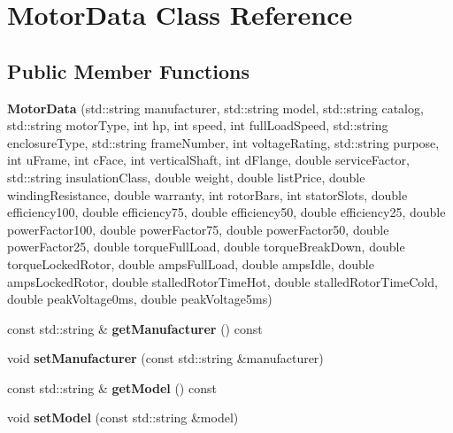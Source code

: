 \hypertarget{class_motor_data}{}\section{Motor\+Data Class Reference}
\label{class_motor_data}
\subsection*{Public Member Functions}
\begin{DoxyCompactItemize}
\item 
\mbox{\label{class_motor_data_aebca34509f0587da9fe3d488aba3a94e}} 
{\bfseries Motor\+Data} (std\+::string manufacturer, std\+::string model, std\+::string catalog, std\+::string motor\+Type, int hp, int speed, int full\+Load\+Speed, std\+::string enclosure\+Type, std\+::string frame\+Number, int voltage\+Rating, std\+::string purpose, int u\+Frame, int c\+Face, int vertical\+Shaft, int d\+Flange, double service\+Factor, std\+::string insulation\+Class, double weight, double list\+Price, double winding\+Resistance, double warranty, int rotor\+Bars, int stator\+Slots, double efficiency100, double efficiency75, double efficiency50, double efficiency25, double power\+Factor100, double power\+Factor75, double power\+Factor50, double power\+Factor25, double torque\+Full\+Load, double torque\+Break\+Down, double torque\+Locked\+Rotor, double amps\+Full\+Load, double amps\+Idle, double amps\+Locked\+Rotor, double stalled\+Rotor\+Time\+Hot, double stalled\+Rotor\+Time\+Cold, double peak\+Voltage0ms, double peak\+Voltage5ms)
\item 
\mbox{\label{class_motor_data_a7740ec636c42ee3d6b2a8ce94864043a}} 
const std\+::string \& {\bfseries get\+Manufacturer} () const
\item 
\mbox{\label{class_motor_data_a3bd37613532ae8c3ca1f40d474af75a2}} 
void {\bfseries set\+Manufacturer} (const std\+::string \&manufacturer)
\item 
\mbox{\label{class_motor_data_a464e52cce186661b1491fd48956c2603}} 
const std\+::string \& {\bfseries get\+Model} () const
\item 
\mbox{\label{class_motor_data_a8d5385d24308d0627f7840ecfe2e6513}} 
void {\bfseries set\+Model} (const std\+::string \&model)

\end{DoxyCompactItemize}
